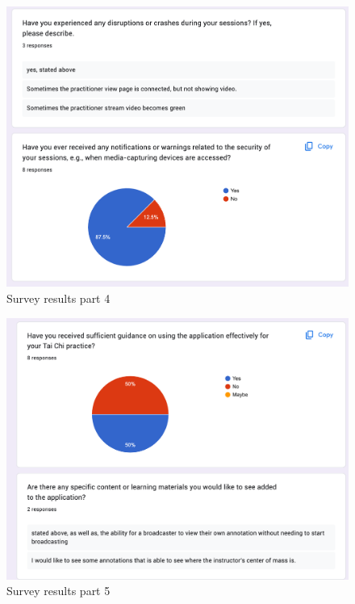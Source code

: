 \documentclass[12pt, titlepage]{article}
\begin{document}
\begin{figure}[!]
  \centering
  \includegraphics[width=1.0\linewidth]{surveyp4.png}
  \caption{Survey results part 4}
  \label{fig:surveyp4}
\end{figure}

\begin{figure}[!]
  \centering
  \includegraphics[width=1.0\linewidth]{surveyp5.png}
  \caption{Survey results part 5}
  \label{fig:surveyp5}
\end{figure}
\FloatBarrier
\end{document}
